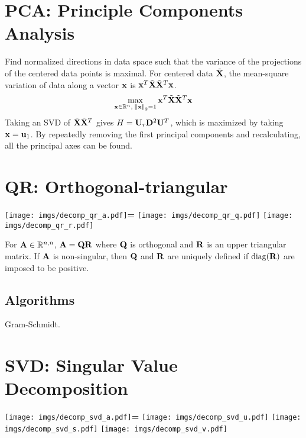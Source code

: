 

\section{PCA: Principle Components Analysis}
Find normalized directions in data space such that the variance of the projections of the centered data points is maximal. For centered data $\tilde {\mathbf{X}}$, the mean-square variation of data along a vector $\mathbf{x}$ is $\mathbf{x}^T \tilde {\mathbf{X}} \tilde {\mathbf{X}}^T \mathbf{x}$.
\begin{equation}
\max_{\mathbf{x}\in\mathbb{R}^{n},~\norm{\mathbf{x}}_2=1} \mathbf{x}^T \tilde {\mathbf{X}} \tilde {\mathbf{X}}^T \mathbf{x}
\end{equation}
Taking an SVD of $\tilde {\mathbf{X}} \tilde {\mathbf{X}}^T$ gives $H=\mathbf{U}_r\mathbf{D}^2\mathbf{U}^T$, which is maximized by taking $\mathbf{x}=\mathbf{u}_1$. By repeatedly removing the first principal components and recalculating, all the principal axes can be found.




\section{QR: Orthogonal-triangular}

\begin{center}
\texttt{[image: imgs/decomp\_qr\_a.pdf]}\textbf{\large =}
\texttt{[image: imgs/decomp\_qr\_q.pdf]}\textbf{\large *}
\texttt{[image: imgs/decomp\_qr\_r.pdf]}
\end{center}

For $\mathbf{A}\in\mathbb{R}^{n,n}$, $\mathbf{A}=\mathbf{Q}\mathbf{R}$ where $\mathbf{Q}$ is orthogonal and $\mathbf{R}$ is an upper triangular matrix. If $\mathbf{A}$ is non-singular, then $\mathbf{Q}$ and $\mathbf{R}$ are uniquely defined if $\operatorname{diag}(\mathbf{R})$ are imposed to be positive.

\subsection*{Algorithms}

Gram-Schmidt.




\section{SVD: Singular Value Decomposition}

\begin{center}
\texttt{[image: imgs/decomp\_svd\_a.pdf]}\textbf{\large =}
\texttt{[image: imgs/decomp\_svd\_u.pdf]}\textbf{\large *}
\texttt{[image: imgs/decomp\_svd\_s.pdf]}\textbf{\large *}
\texttt{[image: imgs/decomp\_svd\_v.pdf]}
\end{center}

